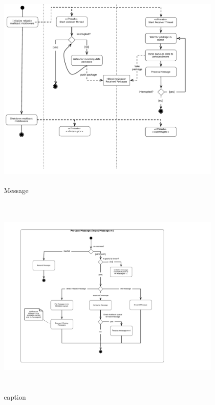 \begin{figure}[htbp]
    \centering
        \includegraphics[height=4in]{figures/receivePackets.pdf}
    \caption{Message}
    \label{fig:figures_processReceivePackage}
\end{figure}

\begin{figure}[htbp]
    \centering
        \includegraphics[height=4in]{figures/processMessages.pdf}
    \caption{caption}
    \label{fig:figures_processMessages}
\end{figure}


